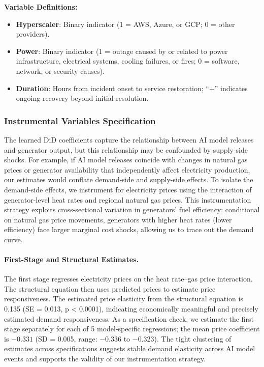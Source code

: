 \documentclass[a4paper,fleqn,longmktitle]{cas-sc}
\begin{document}
\vspace{1em}
\noindent\textbf{Variable Definitions:}
\begin{itemize}
    \item \textbf{Hyperscaler}: Binary indicator (1 = AWS, Azure, or GCP; 0 = other providers).
    \item \textbf{Power}: Binary indicator (1 = outage caused by or related to power infrastructure, electrical systems, cooling failures, or fires; 0 = software, network, or security causes).
    \item \textbf{Duration}: Hours from incident onset to service restoration; ``+'' indicates ongoing recovery beyond initial resolution.
\end{itemize}

\subsubsection{Instrumental Variables Specification}\label{IVDetails}

The learned DiD coefficients capture the relationship between AI model releases and generator output, but this relationship may be confounded by supply-side shocks. For example, if AI model releases coincide with changes in natural gas prices or generator availability that independently affect electricity production, our estimates would conflate demand-side and supply-side effects. To isolate the demand-side effects, we instrument for electricity prices using the interaction of generator-level heat rates and regional natural gas prices. This instrumentation strategy exploits cross-sectional variation in generators' fuel efficiency: conditional on natural gas price movements, generators with higher heat rates (lower efficiency) face larger marginal cost shocks, allowing us to trace out the demand curve.

\paragraph{First-Stage and Structural Estimates.} The first stage regresses electricity prices on the heat rate--gas price interaction. The structural equation then uses predicted prices to estimate price responsiveness. The estimated price elasticity from the structural equation is 0.135 (SE = 0.013, p < 0.0001), indicating economically meaningful and precisely estimated demand responsiveness. As a specification check, we estimate the first stage separately for each of 5 model-specific regressions; the mean price coefficient is $-0.331$ (SD = 0.005, range: $-0.336$ to $-0.323$). The tight clustering of estimates across specifications suggests stable demand elasticity across AI model events and supports the validity of our instrumentation strategy.
\end{document}
